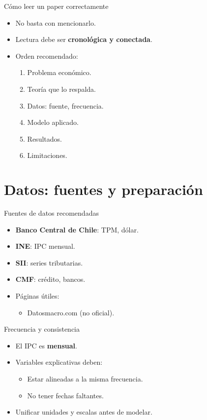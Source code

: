 \documentclass[aspectratio=169,10pt]{beamer}
\begin{document}
\begin{frame}{Cómo leer un paper correctamente}
  \begin{itemize}
    \item No basta con mencionarlo.
    \item Lectura debe ser \textbf{cronológica y conectada}.
    \item Orden recomendado:
      \begin{enumerate}
        \item Problema económico.
        \item Teoría que lo respalda.
        \item Datos: fuente, frecuencia.
        \item Modelo aplicado.
        \item Resultados.
        \item Limitaciones.
      \end{enumerate}
  \end{itemize}
\end{frame}


\section{Datos: fuentes y preparación}

\begin{frame}{Fuentes de datos recomendadas}
  \begin{itemize}
    \item \textbf{Banco Central de Chile}: TPM, dólar.
    \item \textbf{INE}: IPC mensual.
    \item \textbf{SII}: series tributarias.
    \item \textbf{CMF}: crédito, bancos.
    \item Páginas útiles:
      \begin{itemize}
        \item Datosmacro.com (no oficial).
      \end{itemize}
  \end{itemize}
\end{frame}

\begin{frame}{Frecuencia y consistencia}
  \begin{itemize}
    \item El IPC es \textbf{mensual}.
    \item Variables explicativas deben:
      \begin{itemize}
        \item Estar alineadas a la misma frecuencia.
        \item No tener fechas faltantes.
      \end{itemize}
    \item Unificar unidades y escalas antes de modelar.
  \end{itemize}
\end{frame}
\end{document}
